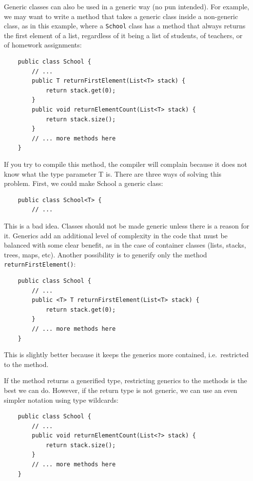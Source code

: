 Generic classes can also be used in a generic way (no pun
intended). For example, we may want to write a method that takes a
generic class inside a non-generic class, as in this example, where a
\verb+School+ class has a method that always returns the first element
of a list, regardless of it being a list of students, of teachers, or of
homework assignments: 

\begin{verbatim}
    public class School {
        // ...
        public T returnFirstElement(List<T> stack) {
            return stack.get(0); 
        }
        public void returnElementCount(List<T> stack) {
            return stack.size();
        }
        // ... more methods here
    }
\end{verbatim}

If you try to compile this method, the compiler will complain because
it does not know what the type parameter T is. There are three ways of
solving this problem. First, we could make School a generic class: 

\begin{verbatim}
    public class School<T> {
        // ...
\end{verbatim}

This is a bad idea. Classes should not be made generic unless there is
a reason for it. Generics add an additional level of complexity in the
code that must be balanced with some clear benefit, as in the case of
container classes (lists, stacks, trees, maps, etc). Another
possibility is to generify only the method
\verb+returnFirstElement()+: 

\begin{verbatim}
    public class School {
        // ...
        public <T> T returnFirstElement(List<T> stack) {
            return stack.get(0); 
        }
        // ... more methods here
    }
\end{verbatim}

This is slightly better because it keeps the generics more
contained, i.e.~restricted to the method. 

If the method returns a generified type, restricting generics to the
methods is the best
we can do. However, if the return type is not generic, 
we can use an even simpler notation using type wildcards: 

\begin{verbatim}
    public class School {
        // ...
        public void returnElementCount(List<?> stack) {
            return stack.size();
        }
        // ... more methods here
    }
\end{verbatim}

